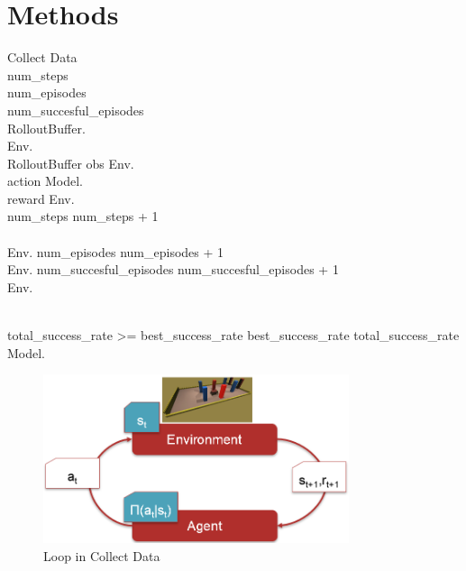 \chapter{Methods}
\label{cha:Methods}



\renewcommand{\thepseudonum}{\roman{pseudonum}}
\begin{pseudocode}{Collect Data}{ }
\\

num\_steps \\
num\_episodes \\
num\_succesful\_episodes \\

RolloutBuffer.\\
Env.\\
\WHILE RolloutBuffer \DO
\BEGIN
obs \GETS Env.\\
action \GETS Model.\\
reward \GETS Env.\\
num\_steps \GETS num\_steps + 1\\
\\
\IF Env. \THEN
num\_episodes \GETS num\_episodes + 1\\
\IF Env. \THEN
num\_succesful\_episodes \GETS num\_succesful\_episodes + 1\\
Env.\\
\END\\



\IF total\_success\_rate >= best\_success\_rate \THEN
\BEGIN
best\_success\_rate \GETS total\_success\_rate\\
Model.\\
\END
\ENDPROCEDURE

\end{pseudocode}

\begin{figure}
     \centering
     \includegraphics[width=0.8\textwidth]{Bilder/rl_cycle.png}
     \caption{Loop in Collect Data}
     \label{fig:unitycommunication}
\end{figure}


